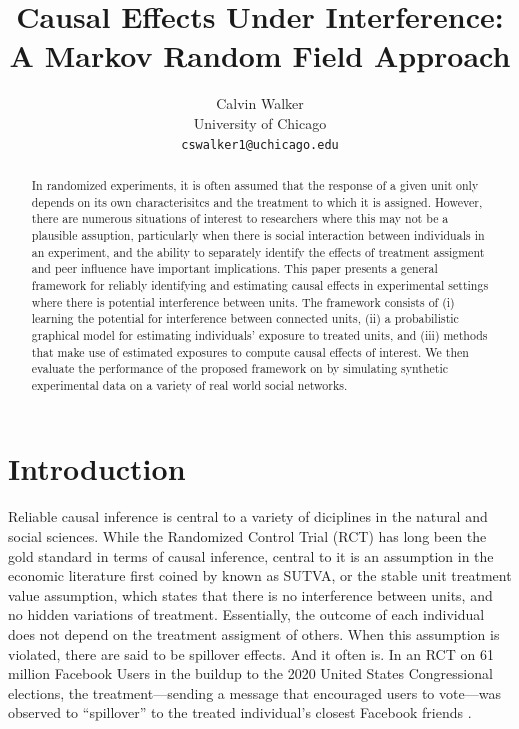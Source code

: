\documentclass{article}
\title{Causal Effects Under Interference: A Markov Random Field Approach}
\author{%
  Calvin Walker \\
  University of Chicago\\
  \texttt{cswalker1@uchicago.edu} \\
}
\begin{document}
\maketitle


\begin{abstract}
    In randomized experiments, it is often assumed that the response of a given unit only depends on its own characterisitcs and the treatment to which it is assigned. However, there are numerous situations of interest to researchers 
    where this may not be a plausible assuption, particularly when there is social interaction between individuals in an experiment, and the ability to separately identify the effects of treatment assigment and peer influence have important implications. 
    This paper presents a general framework for reliably identifying and estimating causal effects in experimental settings where there is potential interference between units. The framework consists of 
    (i) learning the potential for interference between connected units, (ii) a probabilistic graphical model for estimating individuals' exposure to treated units, and (iii) methods that make use of estimated exposures to compute causal effects of interest. We then evaluate the performance of the proposed framework on by simulating synthetic experimental data on a variety of real world social networks.
\end{abstract}


\section{Introduction}

Reliable causal inference is central to a variety of diciplines in the natural and social sciences. While the Randomized Control Trial (RCT) has long been the gold standard in terms of 
causal inference, central to it is an assumption in the economic literature first coined by \cite{Rubin} known as SUTVA, or the stable unit treatment value assumption, which states that there is no
interference between units, and no hidden variations of treatment. Essentially, the outcome of each individual does not depend on the treatment assigment of others. When this assumption is violated, 
there are said to be spillover effects. And it often is. In an RCT on 61 million Facebook Users in the buildup to the 2020 United States Congressional elections, the treatment—sending a message that encouraged users to vote—was 
observed to ``spillover'' to the treated individual's closest Facebook friends \cite{Bond}. 
\end{document}
